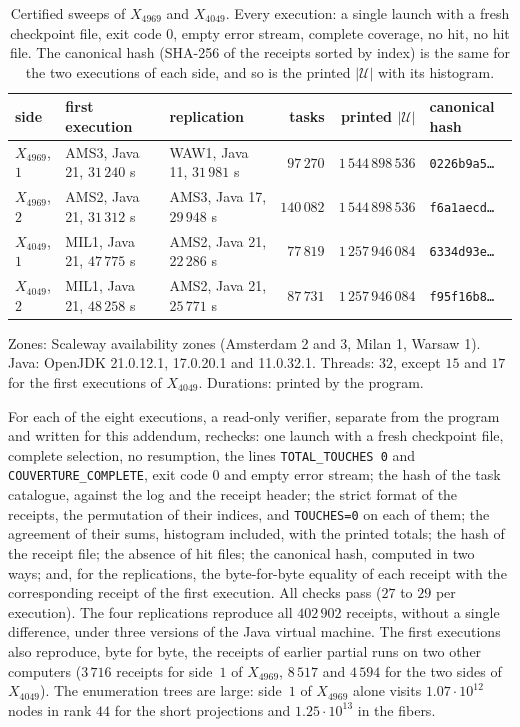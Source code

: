 \documentclass[11pt,a4paper]{amsart}
\theoremstyle{plain}
\theoremstyle{definition}
\newcommand{\Uc}{\mathcal{U}}
\begin{document}
\begin{table}[ht]
\caption{Certified sweeps of $X_{4969}$ and $X_{4049}$. Every execution: a single launch with a fresh checkpoint file, exit code $0$, empty error stream, complete coverage, no hit, no hit file. The canonical hash (SHA-256 of the receipts sorted by index) is the same for the two executions of each side, and so is the printed $|\Uc|$ with its histogram.}\label{tab:sweeps}
\centering\small\setlength{\tabcolsep}{2.8pt}
\begin{tabular}{lll rr l}
\toprule
side & first execution & replication & tasks & printed $|\Uc|$ & canonical hash \\
\midrule
$X_{4969}$, $1$ & AMS3, Java 21, $31\,240$ s & WAW1, Java 11, $31\,981$ s & $97\,270$ & $1\,544\,898\,536$ & \texttt{0226b9a5\dots} \\
$X_{4969}$, $2$ & AMS2, Java 21, $31\,312$ s & AMS3, Java 17, $29\,948$ s & $140\,082$ & $1\,544\,898\,536$ & \texttt{f6a1aecd\dots} \\
$X_{4049}$, $1$ & MIL1, Java 21, $47\,775$ s & AMS2, Java 21, $22\,286$ s & $77\,819$ & $1\,257\,946\,084$ & \texttt{6334d93e\dots} \\
$X_{4049}$, $2$ & MIL1, Java 21, $48\,258$ s & AMS2, Java 21, $25\,771$ s & $87\,731$ & $1\,257\,946\,084$ & \texttt{f95f16b8\dots} \\
\bottomrule
\end{tabular}

\smallskip
\begin{minipage}{0.95\textwidth}\footnotesize
Zones: Scaleway availability zones (Amsterdam 2 and 3, Milan 1, Warsaw 1). Java: OpenJDK 21.0.12.1, 17.0.20.1 and 11.0.32.1. Threads: $32$, except $15$ and $17$ for the first executions of $X_{4049}$. Durations: printed by the program.
\end{minipage}
\end{table}

For each of the eight executions, a read-only verifier, separate from the program and written for this addendum, rechecks: one launch with a fresh checkpoint file, complete selection, no resumption, the lines \texttt{TOTAL\_TOUCHES 0} and \texttt{COUVERTURE\_COMPLETE}, exit code $0$ and empty error stream; the hash of the task catalogue, against the log and the receipt header; the strict format of the receipts, the permutation of their indices, and \texttt{TOUCHES=0} on each of them; the agreement of their sums, histogram included, with the printed totals; the hash of the receipt file; the absence of hit files; the canonical hash, computed in two ways; and, for the replications, the byte-for-byte equality of each receipt with the corresponding receipt of the first execution. All checks pass ($27$ to $29$ per execution). The four replications reproduce all $402\,902$ receipts, without a single difference, under three versions of the Java virtual machine. The first executions also reproduce, byte for byte, the receipts of earlier partial runs on two other computers ($3\,716$ receipts for side~$1$ of $X_{4969}$, $8\,517$ and $4\,594$ for the two sides of $X_{4049}$). The enumeration trees are large: side~$1$ of $X_{4969}$ alone visits $1.07\cdot10^{12}$ nodes in rank $44$ for the short projections and $1.25\cdot10^{13}$ in the fibers.
\end{document}
